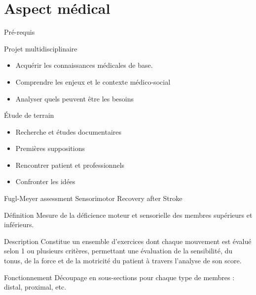 \section{Aspect médical}

\begin{frame}
\end{frame}

\begin{frame}{Pré-requis}
	\begin{block}{Projet multidisciplinaire}
		\begin{itemize}
			\item Acquérir les connaissances médicales de base.
			\item Comprendre les enjeux et le contexte médico-social
			\item Analyser quels peuvent être les besoins
		\end{itemize}			
	\end{block}
		\begin{block}{Étude de terrain}
		\begin{itemize}
			\item Recherche et études documentaires
			\item Premières suppositions 
			\item Rencontrer patient et professionnels 
			\item Confronter les idées
		\end{itemize}			
	\end{block}
\end{frame}

\begin{frame}{Fugl-Meyer assessment Sensorimotor Recovery after Stroke}
	\begin{block}{Définition}
Mesure de la déficience moteur et sensorielle des membres supérieurs et inférieurs.
	\end{block}
	\begin{block}{Description}
Constitue un ensemble d'exercices dont chaque mouvement est évalué selon 1 ou plusieurs critères, permettant une évaluation de la sensibilité, du tonus, de la force et de la motricité du patient à travers l'analyse de son score.
	\end{block}
\end{frame}

\begin{frame}{}
	\begin{block}{Fonctionnement}
		Découpage en sous-sections pour chaque type de membres : distal, proximal, etc.
	\end{block}
\end{frame}